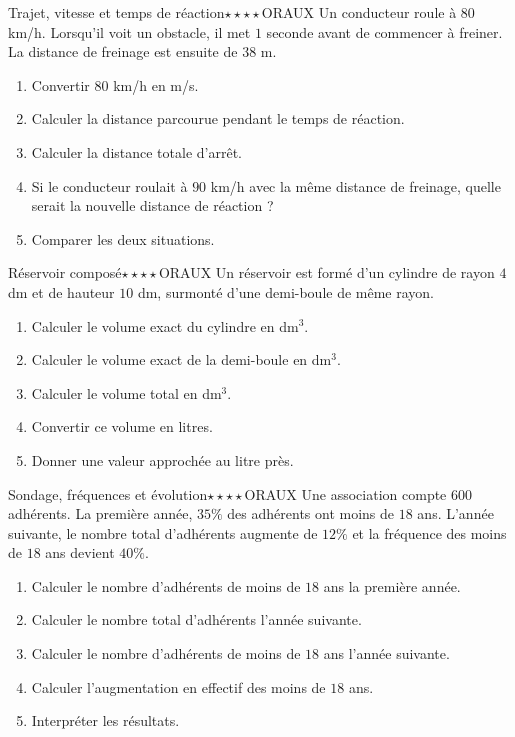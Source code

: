 \documentclass[11pt,a4paper]{article}
\newcounter{exo}
\begin{document}
\begin{exobox}{Trajet, vitesse et temps de réaction}{$\star\star\star\star$}{ORAUX}
Un conducteur roule à $80$ km/h. Lorsqu'il voit un obstacle, il met $1$ seconde avant de commencer à freiner. La distance de freinage est ensuite de $38$ m.
\begin{enumerate}
\item Convertir $80$ km/h en m/s.
\item Calculer la distance parcourue pendant le temps de réaction.
\item Calculer la distance totale d'arrêt.
\item Si le conducteur roulait à $90$ km/h avec la même distance de freinage, quelle serait la nouvelle distance de réaction ?
\item Comparer les deux situations.
\end{enumerate}
\end{exobox}

\begin{exobox}{Réservoir composé}{$\star\star\star\star$}{ORAUX}
Un réservoir est formé d'un cylindre de rayon $4$ dm et de hauteur $10$ dm, surmonté d'une demi-boule de même rayon.
\begin{enumerate}
\item Calculer le volume exact du cylindre en dm$^3$.
\item Calculer le volume exact de la demi-boule en dm$^3$.
\item Calculer le volume total en dm$^3$.
\item Convertir ce volume en litres.
\item Donner une valeur approchée au litre près.
\end{enumerate}
\end{exobox}

\begin{exobox}{Sondage, fréquences et évolution}{$\star\star\star\star$}{ORAUX}
Une association compte $600$ adhérents. La première année, $35\%$ des adhérents ont moins de $18$ ans. L'année suivante, le nombre total d'adhérents augmente de $12\%$ et la fréquence des moins de $18$ ans devient $40\%$.
\begin{enumerate}
\item Calculer le nombre d'adhérents de moins de $18$ ans la première année.
\item Calculer le nombre total d'adhérents l'année suivante.
\item Calculer le nombre d'adhérents de moins de $18$ ans l'année suivante.
\item Calculer l'augmentation en effectif des moins de $18$ ans.
\item Interpréter les résultats.
\end{enumerate}
\end{exobox}
\end{document}
